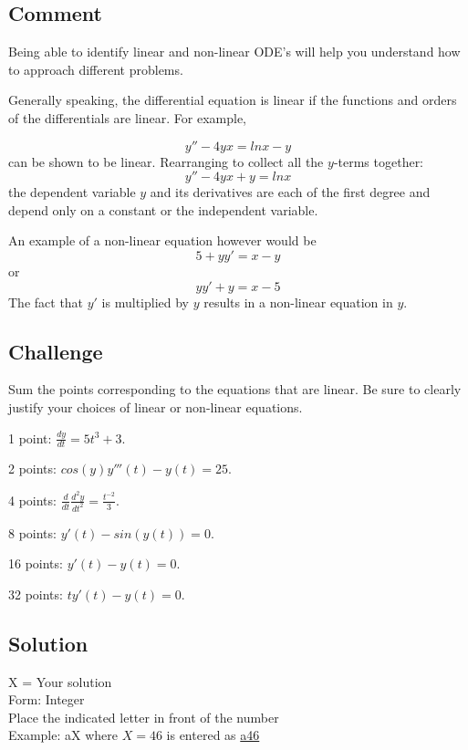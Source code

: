 \subsection*{Comment}
Being able to identify linear and non-linear ODE's will help you understand how to approach different problems.

Generally speaking, the differential equation is linear if the functions and orders of the differentials are linear. For example, 

\begin{equation*}
    y'' - 4yx = ln x - y
\end{equation*}
can be shown to be linear. Rearranging to collect all the $y$-terms together:
\begin{equation*}
    y'' - 4yx + y = ln x
\end{equation*}
the dependent variable $y$ and its derivatives are each of the first degree and depend only on a constant or the independent variable.

An example of a non-linear equation however would be
\begin{equation*}
    5 + yy' = x - y
\end{equation*}
or
\begin{equation*}
    yy' + y = x - 5
\end{equation*}
The fact that $y'$ is multiplied by $y$ results in a non-linear equation in $y$.

\subsection*{Challenge}
Sum the points corresponding to the equations that are linear. Be sure to clearly justify your choices of linear or non-linear equations.

1 point: $\displaystyle \frac{dy}{dt} = 5t^3 + 3$.

2 points: $\displaystyle cos(y) y'''(t) - y(t) = 25$.

4 points: $\displaystyle \frac{d}{dt} \frac{d^2 y}{dt^2} = \frac{t^{-2}}{3}$.

8 points: $\displaystyle y'(t) - sin(y(t)) = 0$.

16 points: $\displaystyle y'(t) - y(t) = 0$.

32 points: $\displaystyle t y'(t) - y(t) = 0$.

\subsection*{Solution}
X = Your solution\\
Form: Integer\\
Place the indicated letter in front of the number\\
Example: aX where $X=46$ is entered as \href{http://www.wolframalpha.com/input/?i=md5+hash+of+\%22a46\%22}{a46}

